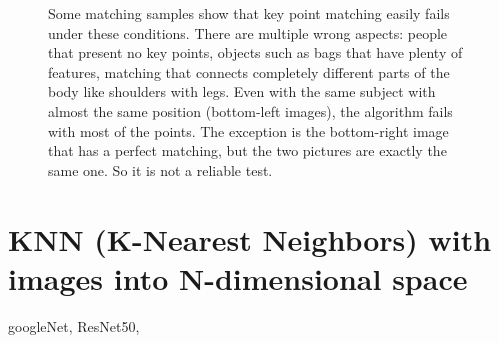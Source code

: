 \begin{figure}[!h]
\begin{subfigure}[!h]{0.24\textwidth}
	\end{subfigure}
	\caption{Some matching samples show that key point matching easily fails under these conditions. There are multiple wrong aspects: people that present no key points, objects such as bags that have plenty of features, matching that connects completely different parts of the body like shoulders with legs. Even with the same subject with almost the same position (bottom-left images), the algorithm fails with most of the points. The exception is the bottom-right image that has a perfect matching, but the two pictures are exactly the same one. So it is not a reliable test.}
	\label{fig:kpMatch_samples}
\end{figure}


\section{KNN (K-Nearest Neighbors) with images into N-dimensional space}\label{sec:knn} \label{sec:classifiers}







googleNet, ResNet50, \cite{ssp_reID}
